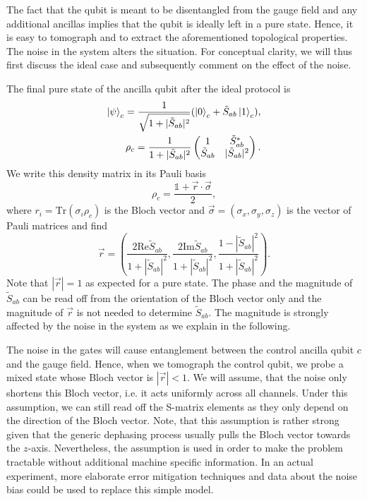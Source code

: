 \documentclass[a4paper,twocolumn,11pt]{quantumarticle}
\begin{document}
The fact that the qubit is meant to be disentangled from the gauge field and any additional ancillas implies that the qubit is ideally left in a pure state. Hence, it is easy to tomograph and to extract the aforementioned topological properties. The noise in the system alters the situation. For conceptual clarity, we will thus first discuss the ideal case and subsequently comment on the effect of the noise.

The final pure state of the ancilla qubit after the ideal protocol is
\begin{equation}
\begin{split}
    \ket{\psi}_c = \frac{1}{\sqrt{1+|\tilde{S}_{ab}|^2}}(\ket{0}_c + \tilde{S}_{ab}\ket{1}_c),\\
    \rho_c = \frac{1}{1+|\tilde{S}_{ab}|^2}\begin{pmatrix}
    1 & \tilde{S}_{ab}^* \\
    \tilde{S}_{ab} & |\tilde{S}_{ab}|^2
    \end{pmatrix}.
\end{split}
\end{equation}
We write this density matrix in its Pauli basis 
\begin{equation}
    \rho_c = \frac{\mathbb{1} + \vec{r} \cdot \vec{\sigma}}{2},
\end{equation}
where  $r_i = \text{Tr}(\sigma_i\rho_c)$ is the Bloch vector and $\vec{\sigma} = (\sigma_x, \sigma_y, \sigma_z)$ is the vector of Pauli matrices and find
\begin{equation}
    \vec{r} = \left( \frac{2 \text{Re}\tilde{S}_{ab}}{1+|\tilde{S}_{ab}|^2}, \frac{2 \text{Im}\tilde{S}_{ab}}{1+|\tilde{S}_{ab}|^2}, \frac{1 - |\tilde{S}_{ab}|^2}{1+|\tilde{S}_{ab}|^2} \right).\label{eqn:bloch}
\end{equation}
Note that $|\vec{r}| = 1$ as expected for a pure state. The phase and the magnitude of $\tilde S_{ab}$ can be read off from the orientation of the Bloch vector only and the magnitude of $\vec r$ is not needed to determine $\tilde S_{ab}$. The magnitude is strongly affected by the noise in the system as we explain in the following.

The noise in the gates will cause entanglement between the control ancilla qubit $c$ and the gauge field. Hence, when we tomograph the control qubit, we probe a mixed state whose Bloch vector is $|\vec{r}|< 1$. We will assume, that the noise only shortens this Bloch vector, i.e. it acts uniformly across all channels. Under this assumption, we can still read off the S-matrix elements as they only depend on the direction of the Bloch vector. Note, that this assumption is rather strong given that the generic dephasing process usually pulls the Bloch vector towards the $z$-axis. Nevertheless, the assumption is used in order to make the problem tractable without additional machine specific information. In an actual experiment, more elaborate error mitigation techniques and data about the noise bias could be used to replace this simple model.
\end{document}

